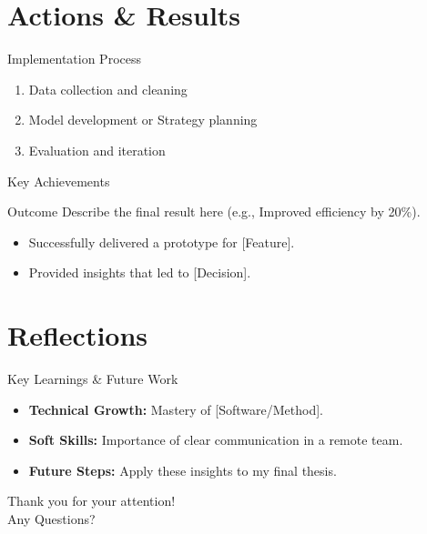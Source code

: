 \documentclass[11pt]{beamer}
\begin{document}
    \section{Actions \& Results}
    \begin{frame}{Implementation Process}
        \begin{enumerate}
            \item Data collection and cleaning
            \item Model development or Strategy planning
            \item Evaluation and iteration
        \end{enumerate}
    \end{frame}

    \begin{frame}{Key Achievements}
        \begin{exampleblock}{Outcome}
            Describe the final result here (e.g., Improved efficiency by 20\%).
        \end{exampleblock}
        \begin{itemize}
            \item Successfully delivered a prototype for [Feature].
            \item Provided insights that led to [Decision].
        \end{itemize}
    \end{frame}

    \section{Reflections}
    \begin{frame}{Key Learnings \& Future Work}
        \begin{itemize}
            \item \textbf{Technical Growth:} Mastery of [Software/Method].
            \item \textbf{Soft Skills:} Importance of clear communication in a remote team.
            \item \textbf{Future Steps:} Apply these insights to my final thesis.
        \end{itemize}
    \end{frame}

    \begin{frame}
        \centering
        \Huge Thank you for your attention!\\
        \vspace{1cm}
        \Large Any Questions?
    \end{frame}
\end{document}
